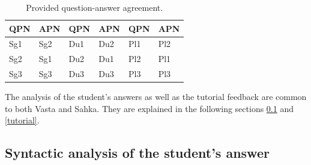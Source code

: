 \documentclass[11pt]{article}
\begin{document}
\begin{table}[htdp]
\caption{Provided question-answer agreement.}
\begin{center}
\begin{tabular}[t]{ll|ll|ll}
QPN &APN &QPN &APN &QPN &APN \\
\hline
Sg1 &Sg2 &Du1 &Du2 &Pl1 &Pl2 \\
Sg2 &Sg1 &Du2 &Du1 &Pl2 &Pl1 \\
Sg3 &Sg3 &Du3 &Du3 &Pl3 &Pl3 \\
\hline
\end{tabular}
\end{center}
\label{QA}
\end{table}

The analysis of the student's answers as well as the tutorial feedback are common to both Vasta and Sahka. They are explained in the following sections \ref{sentencefeedback} and \ref{tutorial}. 


\subsection{Syntactic analysis of the student's answer} \label{sentencefeedback}


\end{document}
